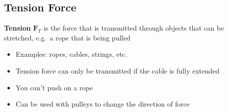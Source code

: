 






\subsection{Tension Force}
\textbf{Tension} $\bm F_T$ is the force that is transmitted through objects
that can be stretched, e.g.\ a rope that is being pulled
\begin{center}
\end{center}
\begin{itemize}
\item Examples: ropes, cables, strings, etc.
\item Tension force can only be transmitted if the cable is fully extended
\item You can't push on a rope
\item Can be used with pulleys to change the direction of force
\end{itemize}




